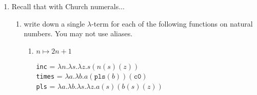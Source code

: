\documentclass{article}
\begin{document}
\begin{enumerate}
\begin{enumerate}
        Evaluation:

        $
        (((\lambda p. (\lambda q. ((p q) ((\lambda a. 
        ((a (\lambda t. (\lambda f. f))) 
        (\lambda t. (\lambda f. t)))) q)))) (\lambda t. (\lambda f. f))) (\lambda t. (\lambda f. t)))
        \\ \rightarrow (((\lambda p. (\lambda q. ((p q) ((q (\lambda t. (\lambda f. f))) (\lambda t. (\lambda f. t)))))) 
        (\lambda t. (\lambda f. f))) (\lambda t. (\lambda f. t)))
        \\ \rightarrow (((\lambda p. (\lambda q. ((p q) ((q (\lambda t. (\lambda f. f))) (\lambda t. (\lambda f. t)))))) 
        (\lambda t. (\lambda x_0. x_0))) (\lambda t. (\lambda f. t)))
        \\ \rightarrow ((\lambda q. (((\lambda t. (\lambda x_0. x_0)) q) ((q (\lambda t. (\lambda f. f))) (\lambda t. 
        (\lambda f. t))))) (\lambda t. (\lambda f. t)))
        \\ \rightarrow ((\lambda q. ((\lambda x_0. x_0) ((q (\lambda t. (\lambda f. f))) (\lambda t. (\lambda f. t))))) 
        (\lambda t. (\lambda f. t)))
        \\ \rightarrow ((\lambda q. ((q (\lambda t. (\lambda f. f))) (\lambda t. (\lambda f. t)))) 
        (\lambda t. (\lambda f. t)))
        \\ \rightarrow ((\lambda q. ((q (\lambda t. (\lambda f. f))) (\lambda t. (\lambda f. t)))) 
        (\lambda x_1. (\lambda f. x_1)))
        \\ \rightarrow (((\lambda x_1. (\lambda f. x_1)) (\lambda t. (\lambda f. f))) 
        (\lambda t. (\lambda f. t)))
        \\ \rightarrow ((\lambda f. (\lambda t. (\lambda f. f))) (\lambda t. (\lambda f. t)))
        \\ \rightarrow (\lambda t. (\lambda f. f))$ = \texttt{fls}
    \end{enumerate}
    \item Recall that with Church numerals...
    \begin{enumerate}
        \item write down a single $\lambda$-term for each of the following functions on natural numbers. You may not use aliases.
        \begin{enumerate}
            \item $n \mapsto 2n + 1$
            
            \texttt{inc} = $\lambda n. \lambda s. \lambda z. s(n(s)(z))$\\
            \texttt{times} = $\lambda a. \lambda b. a(\texttt{pls}(b))(\texttt{c0})$\\
            \texttt{pls} = $\lambda a. \lambda b. \lambda s. \lambda z. a(s)(b(s)(z))$\\


\end{enumerate}
\end{enumerate}
\end{enumerate}
\end{document}
